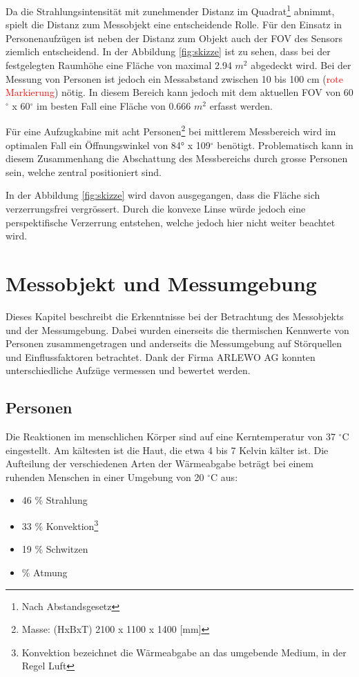 Da die Strahlungsintensität mit zunehmender Distanz im Quadrat\footnote[7]{Nach Abstandsgesetz} abnimmt, spielt die Distanz zum Messobjekt eine entscheidende Rolle. Für den Einsatz in Personenaufzügen ist neben der Distanz zum Objekt auch der \ac{FOV} des Sensors ziemlich entscheidend. In der Abbildung \ref{fig:skizze} ist zu sehen, dass bei der festgelegten Raumhöhe eine Fläche von maximal 2.94 $m^2$ abgedeckt wird. Bei der Messung von Personen ist jedoch ein Messabstand zwischen 10 bis 100 cm (\textcolor{red}{rote Markierung}) nötig. In diesem Bereich kann jedoch mit dem aktuellen \ac{FOV} von 60$^\circ$ x 60$^\circ$ im besten Fall eine Fläche von 0.666 $m^2$ erfasst werden.

Für eine Aufzugkabine mit acht Personen\footnote[8]{Masse: (HxBxT) 2100 x 1100 x 1400 [mm]} bei mittlerem Messbereich wird im optimalen Fall ein Öffnungswinkel von 84° x 109$^\circ$ benötigt. Problematisch kann in diesem Zusammenhang die Abschattung des Messbereichs durch grosse Personen sein, welche zentral positioniert sind.

In der Abbildung \ref{fig:skizze} wird davon ausgegangen, dass die Fläche sich verzerrungsfrei vergrössert. Durch die konvexe Linse würde jedoch eine perspektifische Verzerrung entstehen, welche jedoch hier nicht weiter beachtet wird.


\section{Messobjekt und Messumgebung}
\label{sec:Messobjekt}
Dieses Kapitel beschreibt die Erkenntnisse bei der Betrachtung des Messobjekts und der Messumgebung. Dabei wurden einerseits die thermischen Kennwerte von Personen zusammengetragen und anderseits die Messumgebung auf Störquellen und Einflussfaktoren betrachtet. Dank der Firma ARLEWO AG konnten unterschiedliche Aufzüge vermessen und bewertet werden. 

\subsection{Personen}
\label{subsec:Personen}
Die Reaktionen im menschlichen Körper sind auf eine Kerntemperatur von 37 $^\circ$C eingestellt. Am kältesten ist die Haut, die etwa 4 bis 7 Kelvin  kälter ist. Die Aufteilung der verschiedenen Arten der Wärmeabgabe beträgt bei einem ruhenden Menschen in einer Umgebung von 20 $^\circ$C aus:
\begin{itemize}
	\item 46 \% Strahlung
	\item 33 \% Konvektion\footnote[9]{Konvektion bezeichnet die Wärmeabgabe an
		das umgebende Medium, in der Regel Luft}
	\item 19 \% Schwitzen
	\item {} \% Atmung
\end{itemize}

